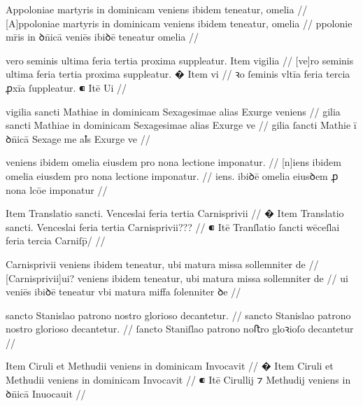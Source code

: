 \ex \bg
 \gla
{}
Appoloniae martyris in dominicam  veniens ibidem teneatur,
omelia
//
\glRekonstrukcja
{}
[A]ppoloniae martyris in dominicam  veniens ibidem teneatur,
omelia
//
\glU
{}
ppolonie mr̄is in ꝺn̄icā  veniēs ibiꝺē teneatur omelia
//
\endgl
\xe



\ex \bg
\gla
{}
vero seminis ultima feria tertia proxima suppleatur.
{} Item vigilia
//
\glRekonstrukcja
{}
[ve]ro seminis ultima feria tertia proxima suppleatur.
� Item vi
//
\glU
{}
ꝛo ſeminis vltīa feria tercia ꝓxīa ſuppleatur. ⁌ Itē Ui
//
\endgl
\xe



\ex \bg
\gla
{}
vigilia sancti Mathiae in dominicam Sexagesimae alias Exurge
veniens
//
\glRekonstrukcja
{}
gilia sancti Mathiae in dominicam Sexagesimae alias Exurge
ve
//
\glU
{}
gilia ſancti Mathie ī ꝺn̄icā Sexageme aꝉs Exurge ve
//
\endgl
\xe



\ex \bg
\gla
{}
veniens ibidem omelia eiusdem pro nona lectione imponatur.
//
\glRekonstrukcja
{}
[n]iens ibidem omelia eiusdem pro nona lectione imponatur.
//
\glU
{}
iens. ibiꝺē omelia eiusꝺem ꝓ nona lcōe imponatur
//
\endgl
\xe



\ex \bg
\gla
{} {} Item Translatio sancti. Venceslai feria tertia Carnisprivii
//
\glRekonstrukcja
{}
� Item Translatio sancti. Venceslai feria tertia Carnisprivii???
//
\glU
{}
⁌ Itē Tranſlatio ſancti wēceſlai feria tercia Carniſp̄/
//
\endgl
\xe



\ex \bg
\gla
{}
Carnisprivii veniens
ibidem teneatur, ubi matura missa sollemniter de
//
\glRekonstrukcja
{}
[Carnisprivii]ui? veniens
ibidem teneatur, ubi matura missa sollemniter de
//
\glU
{}
ui veniēs ibiꝺē teneatur vbi matura miﬀa ſolenniter ꝺe
//
\endgl
\xe



\ex \bg
\gla
{}
sancto Stanislao patrono nostro glorioso decantetur.
//
\glRekonstrukcja
{}
sancto Stanislao patrono nostro glorioso decantetur.
//
\glU
{}
ſancto Staniſlao patrono noﬅro gloꝛioſo decantetur
//
\endgl
\xe



\ex \bg
\gla
{}
{} Item Ciruli et Methudii veniens in dominicam Invocavit
//
\glRekonstrukcja
{}
� Item Ciruli et Methudii veniens in dominicam Invocavit
//
\glU
{}
⁌ Itē Cirullij ⁊ Methudij veniens in ꝺn̄icā Inuocauit
//
\endgl
\xe



